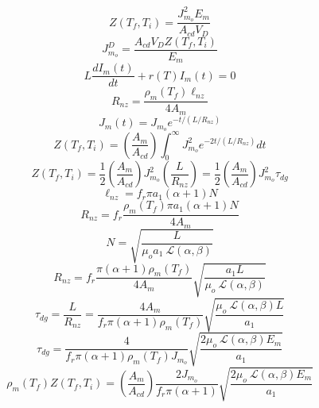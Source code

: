 \begin{equation}%
Z(T_f,T_i)=\frac{J_{m_o}^{2}E_m}{A_{cd}V_D}
\end{equation}
\begin{equation}%
J_{m_o}^{D}=\frac{A_{cd}V_DZ(T_f,T_i)}{E_m}
\end{equation}
\begin{equation}%
L\frac{dI_m(t)}{dt}+r(T)I_m(t)=0
\end{equation}
\begin{equation}%
R_{nz}=\frac{\rho_m(T_f)\ell_{nz}}{4A_m}
\end{equation}
\begin{equation}%
J_m(t)=J_{m_o}e^{-t/(L/R_{nz})}
\end{equation}
\begin{equation}%
Z(T_f,T_i)=\left(\frac{A_m}{A_{cd}}\right)\int_{0}^{\infty}J_{m_o}^{2}e^{-2t/(L/R_{nz})}dt
\end{equation}
\begin{equation}%
Z(T_f,T_i)=\frac{1}{2}\left(\frac{A_m}{A_{cd}}\right)J_{m_o}^{2}\left(\frac{L}{R_{nz}}\right) 
=\frac{1}{2}\left(\frac{A_m}{A_{cd}}\right)J_{m_o}^{2}\tau_{dg}
\end{equation}
\begin{equation}%
\ell_{nz}=f_r\pi a_1(\alpha+1)N
\end{equation}
\begin{equation}%
R_{nz}=f_r\frac{\rho_m(T_f)\pi a_1(\alpha+1)N}{4A_m}
\end{equation}
\begin{equation}%
N=\sqrt{\frac{L}{\mu_oa_1\ \mathcal{L}(\alpha,\beta)}}
\end{equation}
\begin{equation}%
R_{nz}=f_r\frac{\pi(\alpha+1)\rho_m(T_f)}{4A_m}\sqrt{\frac{a_1L}{\mu_o\ \mathcal{L}(\alpha,\beta)}}
\end{equation}
\begin{equation}%
\tau_{dg}=\frac{L}{R_{nz}}=\frac{4A_m}{f_r\pi(\alpha+1)\rho_m(T_f)}\sqrt{\frac{\mu_o\ \mathcal{L}(\alpha,\beta)L}{a_1}}
\end{equation}
\begin{equation}%
\tau_{dg}=\frac{4}{f_r\pi(\alpha+1)\rho_m(T_f)J_{m_o}}\sqrt{\frac{2\mu_o\ \mathcal{L}(\alpha,\beta)E_m}{a_1}}
\end{equation}
\begin{equation}%
\rho_m(T_f)Z(T_f,T_i)=\left(\frac{A_m}{A_{cd}}\right)\frac{2J_{m_o}}{f_r\pi(\alpha+1)}\sqrt{\frac{2\mu_o\ \mathcal{L}(\alpha,\beta)E_m}{a_1}}
\end{equation}
